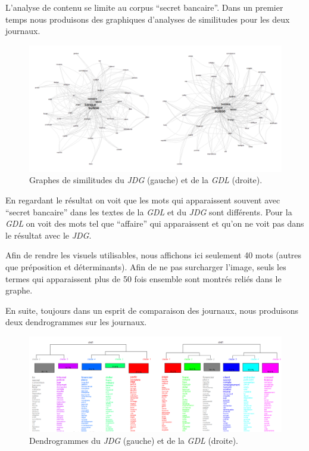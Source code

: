 \documentclass[a4paper, 11pt]{article}
\begin{document}
L'analyse de contenu se limite au corpus ``secret bancaire''. Dans un
premier temps nous produisons des graphiques d'analyses de similitudes
pour les deux journaux.

\begin{figure}
\centering
\includegraphics[width=1\textwidth ]{methodology/similitude.png}
\caption{Graphes de similitudes du \emph{JDG} (gauche) et de la
\emph{GDL} (droite).}
\end{figure}

En regardant le résultat on voit que les mots qui apparaissent souvent
avec ``secret bancaire'' dans les textes de la \emph{GDL} et du
\emph{JDG} sont différents. Pour la \emph{GDL} on voit des mots tel que
``affaire'' qui apparaissent et qu'on ne voit pas dans le résultat avec
le \emph{JDG}.

Afin de rendre les visuels utilisables, nous affichons ici seulement 40
mots (autres que préposition et déterminants). Afin de ne pas surcharger
l'image, seuls les termes qui apparaissent plus de 50 fois ensemble sont
montrés reliés dans le graphe.

En suite, toujours dans un esprit de comparaison des journaux, nous
produisons deux dendrogrammes sur les journaux.

\begin{figure}
\centering
\includegraphics[width=1\textwidth ]{methodology/dendrogram.png}
\caption{Dendrogrammes du \emph{JDG} (gauche) et de la \emph{GDL}
(droite).}
\end{figure}
\end{document}
